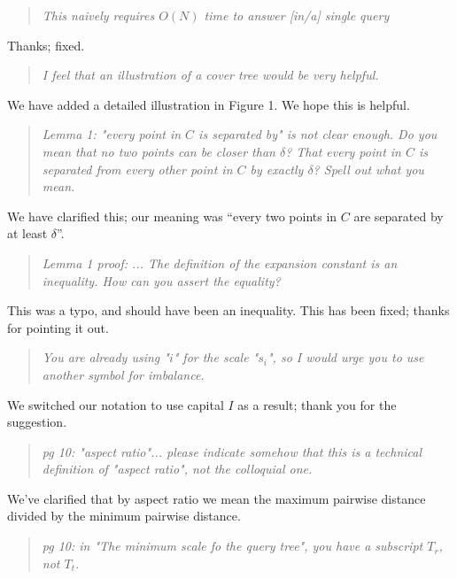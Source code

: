\documentclass[twoside,11pt]{article}
\begin{document}
\begin{quote}{\it
This naively requires $O(N)$ time to answer [in/a] single query
}\end{quote}

Thanks; fixed.

\begin{quote}{\it
I feel that an illustration of a cover tree would be very helpful.
}\end{quote}

We have added a detailed illustration in Figure 1.  We hope this is helpful.

\begin{quote}{\it
Lemma 1: "every point in $C$ is separated by" is not clear enough.  Do you mean
that no two points can be closer than $\delta$?  That every point in $C$ is
separated from every other point in $C$ by exactly $\delta$?  Spell out what you
mean.
}\end{quote}

We have clarified this; our meaning was ``every two points in $C$ are separated
by at least $\delta$''.

\begin{quote}{\it
Lemma 1 proof: ... The definition of the expansion constant is an inequality.
How can
you assert the equality?
}\end{quote}

This was a typo, and should have been an inequality.  This has been fixed;
thanks for pointing it out.

\begin{quote}{\it
You are already using "$i$" for the scale "$s_i$", so I would urge you to
use another symbol for imbalance.
}\end{quote}

We switched our notation to use capital $I$ as a result; thank you for the
suggestion.

\begin{quote}{\it
pg 10: "aspect ratio"... please indicate somehow that this is a
technical definition of "aspect ratio", not the colloquial one.
}\end{quote}

We've clarified that by aspect ratio we mean the maximum pairwise distance
divided by the minimum pairwise distance.

\begin{quote}{\it
pg 10:
in "The minimum scale fo the query tree", you have a subscript $T_r$, not $T_t$.
}\end{quote}
\end{document}
